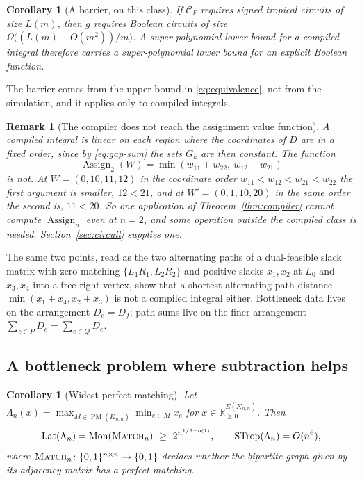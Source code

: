 \documentclass[11pt]{article}
\newtheorem{corollary}[theorem]{Corollary}
\newtheorem{remark}[theorem]{Remark}
\newcommand{\Assign}{\operatorname{Assign}}
\newcommand{\PM}{\operatorname{PM}}
\begin{document}
\begin{corollary}[A barrier, on this class]
\label{cor:barrier}
If $\mathcal C_F$ requires signed tropical circuits of size $L(m)$, then $g$
requires Boolean circuits of size $\Omega\bigl((L(m)-O(m^{2}))/m\bigr)$.  A
super-polynomial lower bound for a compiled integral therefore carries a
super-polynomial lower bound for an explicit Boolean function.
\end{corollary}

The barrier comes from the upper bound in \eqref{eq:equivalence}, not from the
simulation, and it applies only to compiled integrals.

\begin{remark}[The compiler does not reach the assignment value function]
\label{rem:not-braid}
A compiled integral is linear on each region where the coordinates of $D$ are in
a fixed order, since by \eqref{eq:gap-sum} the sets $G_k$ are then constant.
The function
\[
  \Assign_2(W)=\min(w_{11}+w_{22},\ w_{12}+w_{21})
\]
is not.  At $W=(0,10,11,12)$ in the coordinate order
$w_{11}<w_{12}<w_{21}<w_{22}$ the first argument is smaller, $12<21$, and at
$W'=(0,1,10,20)$ in the same order the second is, $11<20$.  So one application
of Theorem~\ref{thm:compiler} cannot compute $\Assign_n$ even at $n=2$, and some
operation outside the compiled class is needed.  Section~\ref{sec:circuit}
supplies one.
\end{remark}

The same two points, read as the two alternating paths of a dual-feasible slack
matrix with zero matching $\{L_1R_1,L_2R_2\}$ and positive slacks
$x_1,x_2$ at $L_0$ and $x_3,x_4$ into a free right vertex, show that a shortest
alternating path distance $\min(x_1+x_4,x_2+x_3)$ is not a compiled integral
either.  Bottleneck data lives on the arrangement $D_e=D_f$; path sums live on
the finer arrangement $\sum_{e\in P}D_e=\sum_{e\in Q}D_e$.

\subsection{A bottleneck problem where subtraction helps}
\label{sec:bottleneck}

\begin{corollary}[Widest perfect matching]
\label{cor:bottleneck}
Let $\Lambda_n(x)=\max_{M\in\PM(K_{n,n})}\min_{e\in M}x_e$ for
$x\in\mathbb R_{\ge0}^{E(K_{n,n})}$.  Then
\[
  \operatorname{Lat}(\Lambda_n)=\operatorname{Mon}(\textsc{Match}_n)\ \ge\ 2^{n^{1/3-o(1)}},
  \qquad
  \operatorname{STrop}(\Lambda_n)=O(n^{6}),
\]
where $\textsc{Match}_n\colon\{0,1\}^{n\times n}\to\{0,1\}$ decides whether the
bipartite graph given by its adjacency matrix has a perfect matching.
\end{corollary}
\end{document}
